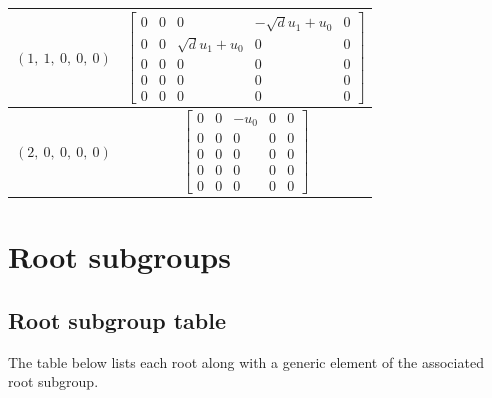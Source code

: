\documentclass[11pt]{article}
\newcommand{\noi}{\noindent}
\theoremstyle{definition}
\begin{document}
\begin{tabular}{|l|c|}
    \hline
    $\left( 1, \  1, \  0, \  0, \  0\right)$ & $\left[\begin{matrix}0 & 0 & 0 & - \sqrt{d} u_{1} + u_{0} & 0\\0 & 0 & \sqrt{d} u_{1} + u_{0} & 0 & 0\\0 & 0 & 0 & 0 & 0\\0 & 0 & 0 & 0 & 0\\0 & 0 & 0 & 0 & 0\end{matrix}\right]$ \\
    \hline
    $\left( 2, \  0, \  0, \  0, \  0\right)$ & $\left[\begin{matrix}0 & 0 & - u_{0} & 0 & 0\\0 & 0 & 0 & 0 & 0\\0 & 0 & 0 & 0 & 0\\0 & 0 & 0 & 0 & 0\\0 & 0 & 0 & 0 & 0\end{matrix}\right]$ \\
    \hline
\end{tabular}


\newpage
\section{Root subgroups}

\subsection{Root subgroup table}

\noi The table below lists each root along with a generic element of the associated root subgroup.

\bigskip
\end{document}
